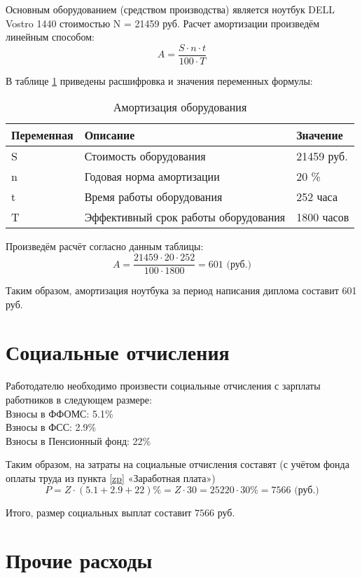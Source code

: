 Основным оборудованием (средством производства) является ноутбук DE\-LL Vostro 1440 стоимостью N = 21459 руб. Расчет амортизации произведём линейным способом:
$$
A = \frac{S\cdot n \cdot t}{ 100 \cdot T}
$$

В таблице \ref{ammort} приведены расшифровка и значения переменных формулы:
\begin{table}[H]
\caption{Амортизация оборудования \label{ammort}}
\begin{center}
\begin{tabular}{|p{3.0cm}|p{3.8cm}|p{2.6cm}|}
\hline
Переменная&Описание&Значение\\
\hline
S&Стоимость оборудования&21459 руб.\\
\hline
n&Годовая норма амортизации&20 \%\\
\hline
t&Время работы оборудования&252 часа\\
\hline
T&Эффективный срок работы оборудования&1800 часов\\
\hline
\end{tabular}
\end{center}
\end{table}

Произведём расчёт согласно данным таблицы:
$$
A = \frac{21459\cdot 20 \cdot 252}{ 100 \cdot 1800} = 601 \mbox{ (руб.)}
$$

Таким образом, амортизация ноутбука за период написания диплома со\-ставит 601 руб.

\section{Социальные отчисления}

Работодателю необходимо произвести социальные отчисления с зарплаты работников в следующем размере:
\\
Взносы в ФФОМС: 5.1\%\\
Взносы в ФСС: 2.9\%\\
Взносы в Пенсионный фонд: 22\%

Таким образом, на затраты на социальные отчисления составят (с учётом фонда оплаты труда из пункта \ref{zp} «Заработная плата»)
$$
P = Z \cdot (5.1 + 2.9 + 22)\% = Z \cdot 30 = 25220 \cdot 30\% = 7566 \mbox{ (руб.)}
$$

Итого, размер социальных выплат составит $7566$ руб.

\section{Прочие расходы}

